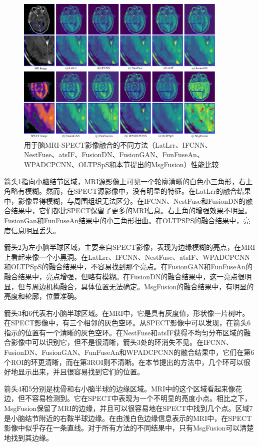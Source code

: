      \begin{figure}[ht]
      \centering
       \includegraphics[width=0.9\textwidth]{figs/paper1mpd008roi.pdf}
      \caption{用于脑MRI-SPECT影像融合的不同方法（LatLrr、IFCNN、NestFuse、atsIF、FusionDN、FusionGAN、FunFuseAn、WPADCPCNN、OLTPSpS和本节提出的MsgFusion）性能比较} \label{paper1mpd008roi}
     \end{figure}
     
箭头1指向小脑结节区域，MRI源影像上可见一个轮廓清晰的白色小三角形，右上角略有模糊。然而，在SPECT源影像中，没有明显的特征。在LatLrr的融合结果中，影像显得模糊，与周围组织无法区分。在IFCNN、NestFuse和FusionDN的融合结果中，它们都比SPECT保留了更多的MRI信息。右上角的增强效果不明显。FusionGan和FunFuseAn结果中的小三角形扭曲。在OLTPSPS的融合结果中，亮度信息明显丢失。

箭头2为左小脑半球区域，主要来自SPECT影像，表现为边缘模糊的亮点，在MRI上看起来像一个小黑洞。在LatLrr、IFCNN、NestFuse、atsIF、WPADCPCNN和OLTPSpS的融合结果中，不容易找到那个亮点。在FusionGAN和FunFuseAn的融合结果中，亮点增强，但略有模糊。在FusionDN的融合结果中，这一亮点很明显，但与周边机构融合，具体位置无法确定。MsgFusion的融合结果中，有明显的亮度和轮廓，位置准确。

箭头3和6代表右小脑半球区域。在MRI中，它是具有灰度值，形状像一片树叶。在SPECT影像中，有三个相邻的灰色空环。从SPECT影像中可以发现，在箭头6指示的位置有一个清晰的灰色空环。在NestFuse和atsIF获得不均匀分布区域的融合影像中可以识别它，但不是很清晰，箭头3处的环消失不见。在IFCNN、FusionDN、FusionGAN、FunFuseAn和WPADCPCNN的融合结果中，它们在第6个ROI的环更清晰，而在第3ROI则不清晰。在本节提出的方法中，几个环可以很好地显示出来，并且很容易找到它们的位置。

箭头4和5分别是枕骨和右小脑半球的边缘区域。MRI中的这个区域看起来像花边，但不容易检测到。它在SPECT中表现为一个不明显的亮度小点。相比之下，MsgFusion保留了MRI的边缘，并且可以很容易地在SPECT中找到几个点。区域7是小脑结节附近的右鞍半球边缘。在由浅白色边缘信息表示的MRI中，在SPECT影像中似乎存在一条直线。对于所有方法的不同结果中，只有MsgFusion可以清楚地找到其边缘。

